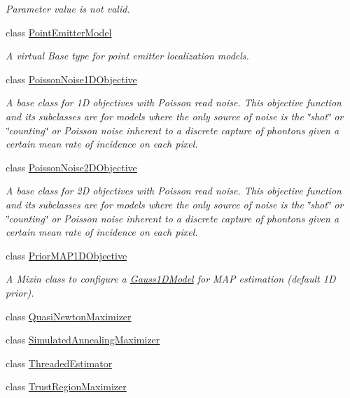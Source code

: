 \begin{DoxyCompactItemize}
\begin{DoxyCompactList}\small\item\em Parameter value is not valid. \end{DoxyCompactList}\item 
class \hyperlink{classmappel_1_1PointEmitterModel}{Point\+Emitter\+Model}
\begin{DoxyCompactList}\small\item\em A virtual Base type for point emitter localization models. \end{DoxyCompactList}\item 
class \hyperlink{classmappel_1_1PoissonNoise1DObjective}{Poisson\+Noise1\+D\+Objective}
\begin{DoxyCompactList}\small\item\em A base class for 1D objectives with Poisson read noise. This objective function and its subclasses are for models where the only source of noise is the \char`\"{}shot\char`\"{} or \char`\"{}counting\char`\"{} or Poisson noise inherent to a discrete capture of phontons given a certain mean rate of incidence on each pixel. \end{DoxyCompactList}\item 
class \hyperlink{classmappel_1_1PoissonNoise2DObjective}{Poisson\+Noise2\+D\+Objective}
\begin{DoxyCompactList}\small\item\em A base class for 2D objectives with Poisson read noise. This objective function and its subclasses are for models where the only source of noise is the \char`\"{}shot\char`\"{} or \char`\"{}counting\char`\"{} or Poisson noise inherent to a discrete capture of phontons given a certain mean rate of incidence on each pixel. \end{DoxyCompactList}\item 
class \hyperlink{classmappel_1_1PriorMAP1DObjective}{Prior\+M\+A\+P1\+D\+Objective}
\begin{DoxyCompactList}\small\item\em A Mixin class to configure a \hyperlink{classmappel_1_1Gauss1DModel}{Gauss1\+D\+Model} for M\+AP estimation (default 1D prior). \end{DoxyCompactList}\item 
class \hyperlink{classmappel_1_1QuasiNewtonMaximizer}{Quasi\+Newton\+Maximizer}
\item 
class \hyperlink{classmappel_1_1SimulatedAnnealingMaximizer}{Simulated\+Annealing\+Maximizer}
\item 
class \hyperlink{classmappel_1_1ThreadedEstimator}{Threaded\+Estimator}
\item 
class \hyperlink{classmappel_1_1TrustRegionMaximizer}{Trust\+Region\+Maximizer}
\end{DoxyCompactItemize}
